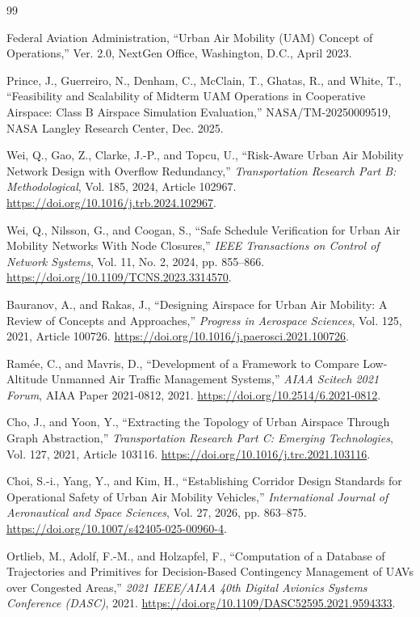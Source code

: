 \documentclass[11pt,letterpaper]{article}
\begin{document}
\begin{thebibliography}{99}

Federal Aviation Administration, ``Urban Air Mobility (UAM) Concept of Operations,'' Ver. 2.0, NextGen Office, Washington, D.C., April 2023.

Prince, J., Guerreiro, N., Denham, C., McClain, T., Ghatas, R., and White, T., ``Feasibility and Scalability of Midterm UAM Operations in Cooperative Airspace: Class B Airspace Simulation Evaluation,'' NASA/TM-20250009519, NASA Langley Research Center, Dec. 2025.

Wei, Q., Gao, Z., Clarke, J.-P., and Topcu, U., ``Risk-Aware Urban Air Mobility Network Design with Overflow Redundancy,'' \emph{Transportation Research Part B: Methodological}, Vol. 185, 2024, Article 102967. \url{https://doi.org/10.1016/j.trb.2024.102967}.

Wei, Q., Nilsson, G., and Coogan, S., ``Safe Schedule Verification for Urban Air Mobility Networks With Node Closures,'' \emph{IEEE Transactions on Control of Network Systems}, Vol. 11, No. 2, 2024, pp. 855--866. \url{https://doi.org/10.1109/TCNS.2023.3314570}.

Bauranov, A., and Rakas, J., ``Designing Airspace for Urban Air Mobility: A Review of Concepts and Approaches,'' \emph{Progress in Aerospace Sciences}, Vol. 125, 2021, Article 100726. \url{https://doi.org/10.1016/j.paerosci.2021.100726}.

Ram\'{e}e, C., and Mavris, D., ``Development of a Framework to Compare Low-Altitude Unmanned Air Traffic Management Systems,'' \emph{AIAA Scitech 2021 Forum}, AIAA Paper 2021-0812, 2021. \url{https://doi.org/10.2514/6.2021-0812}.

Cho, J., and Yoon, Y., ``Extracting the Topology of Urban Airspace Through Graph Abstraction,'' \emph{Transportation Research Part C: Emerging Technologies}, Vol. 127, 2021, Article 103116. \url{https://doi.org/10.1016/j.trc.2021.103116}.

Choi, S.-i., Yang, Y., and Kim, H., ``Establishing Corridor Design Standards for Operational Safety of Urban Air Mobility Vehicles,'' \emph{International Journal of Aeronautical and Space Sciences}, Vol. 27, 2026, pp. 863--875. \url{https://doi.org/10.1007/s42405-025-00960-4}.

Ortlieb, M., Adolf, F.-M., and Holzapfel, F., ``Computation of a Database of Trajectories and Primitives for Decision-Based Contingency Management of UAVs over Congested Areas,'' \emph{2021 IEEE/AIAA 40th Digital Avionics Systems Conference (DASC)}, 2021. \url{https://doi.org/10.1109/DASC52595.2021.9594333}.


\end{thebibliography}
\end{document}
